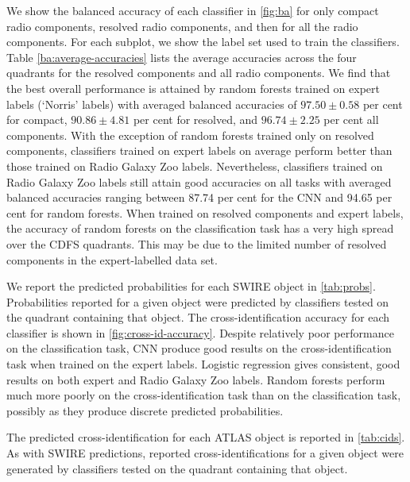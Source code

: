 \documentclass[fleqn,usenatbib,usedcolumn]{mnras}
\begin{document}
  We show the balanced accuracy of each classifier in \autoref{fig:ba} for only compact radio components, resolved radio components, and then for all the radio components. For each subplot, we show the label set used to train the classifiers. Table \ref{ba:average-accuracies} lists the average accuracies across the four quadrants for the resolved components and all radio components. We find that the
  best overall performance is attained by random forests trained on expert
  labels (`Norris' labels) with averaged balanced accuracies of $97.50 \pm 0.58$ per cent for compact, $90.86 \pm 4.81$ per cent for resolved, and $96.74 \pm 2.25$ per cent all components. With the exception of random forests trained only on resolved
  components, classifiers trained on expert labels on average perform better
  than those trained on Radio Galaxy Zoo labels. Nevertheless, classifiers
  trained on Radio Galaxy Zoo labels still attain good accuracies on
  all tasks with averaged balanced accuracies ranging between 87.74 per cent for the CNN and 94.65 per cent for random forests.  When trained on resolved components and expert labels,
  the accuracy of random forests on the classification task has a very high
  spread over the CDFS quadrants. This may be due to the limited number of
  resolved components in the expert-labelled data set.

  We report the predicted probabilities for each SWIRE object in \autoref{tab:probs}. Probabilities reported for a given object
  were predicted by classifiers tested on the quadrant containing that object. The cross-identification accuracy for each classifier is shown in
  \autoref{fig:cross-id-accuracy}. Despite relatively poor performance on the
  classification task, CNN produce good results on the cross-identification task
  when trained on the expert labels. Logistic regression gives consistent, good
  results on both expert and Radio Galaxy Zoo labels. Random forests perform
  much more poorly on the cross-identification task than on the classification
  task, possibly as they produce discrete predicted probabilities.

  The predicted cross-identification for each ATLAS object is reported in
  \autoref{tab:cids}. As with SWIRE predictions, reported cross-identifications
  for a given object were generated by classifiers tested on the quadrant
  containing that object.
\end{document}
